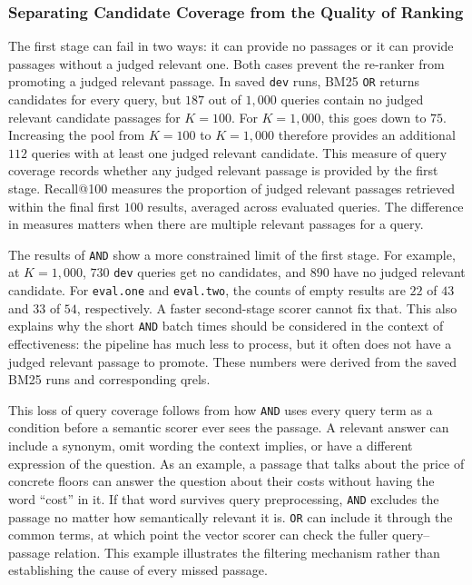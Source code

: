 \documentclass[11pt]{article}
\begin{document}
\subsubsection{Separating Candidate Coverage from the Quality of Ranking}
The first stage can fail in two ways: it can provide no passages or it can provide passages without a judged relevant one. Both cases prevent the re-ranker from promoting a judged relevant passage. In saved \texttt{dev} runs, BM25 \texttt{OR} returns candidates for every query, but $187$ out of $1{,}000$ queries contain no judged relevant candidate passages for $K=100$. For $K=1{,}000$, this goes down to $75$. Increasing the pool from $K=100$ to $K=1{,}000$ therefore provides an additional $112$ queries with at least one judged relevant candidate. This measure of query coverage records whether any judged relevant passage is provided by the first stage. Recall@100 measures the proportion of judged relevant passages retrieved within the final first $100$ results, averaged across evaluated queries. The difference in measures matters when there are multiple relevant passages for a query.

The results of \texttt{AND} show a more constrained limit of the first stage. For example, at $K=1{,}000$, $730$ \texttt{dev} queries get no candidates, and $890$ have no judged relevant candidate. For \texttt{eval.one} and \texttt{eval.two}, the counts of empty results are $22$ of $43$ and $33$ of $54$, respectively. A faster second-stage scorer cannot fix that. This also explains why the short \texttt{AND} batch times should be considered in the context of effectiveness: the pipeline has much less to process, but it often does not have a judged relevant passage to promote. These numbers were derived from the saved BM25 runs and corresponding qrels.

This loss of query coverage follows from how \texttt{AND} uses every query term as a condition before a semantic scorer ever sees the passage. A relevant answer can include a synonym, omit wording the context implies, or have a different expression of the question. As an example, a passage that talks about the price of concrete floors can answer the question about their costs without having the word ``cost'' in it. If that word survives query preprocessing, \texttt{AND} excludes the passage no matter how semantically relevant it is. \texttt{OR} can include it through the common terms, at which point the vector scorer can check the fuller query--passage relation. This example illustrates the filtering mechanism rather than establishing the cause of every missed passage.
\end{document}
